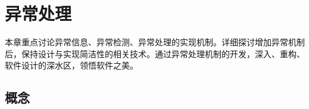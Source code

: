 \begin{savequote}[45mm]
\end{savequote}

\chapter{异常处理} 
\label{ch:except-handle}

\begin{content}

本章重点讨论异常信息、异常检测、异常处理的实现机制。详细探讨增加异常机制后，保持设计与实现简洁性的相关技术。通过异常处理机制的开发，深入、重构、软件设计的深水区，领悟软件之美。

\end{content}

\section{概念}

